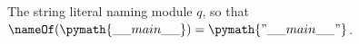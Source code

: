 The string literal naming module $q$, so that $\nameOf(\pymath{\_\_main\_\_}) = \pymath{"\_\_main\_\_"}$.
